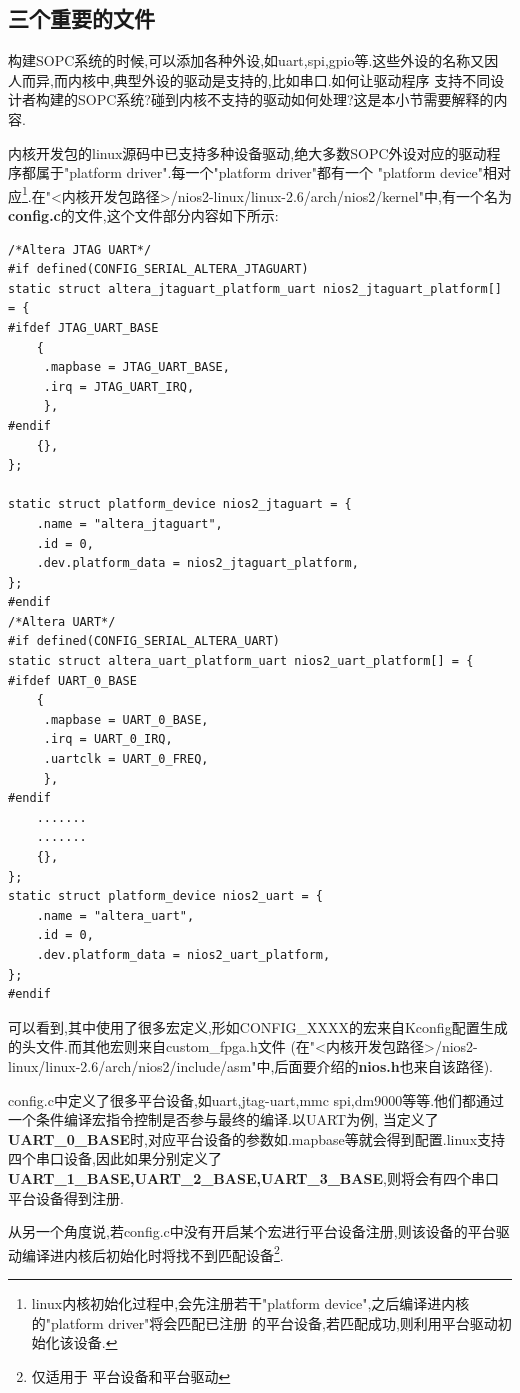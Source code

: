 \documentclass[12pt,a4paper,titlepage]{article}
\begin{document}
\subsection{三个重要的文件}
构建SOPC系统的时候,可以添加各种外设,如uart,spi,gpio等.这些外设的名称又因人而异,而内核中,典型外设的驱动是支持的,比如串口.如何让驱动程序
支持不同设计者构建的SOPC系统?碰到内核不支持的驱动如何处理?这是本小节需要解释的内容.

内核开发包的linux源码中已支持多种设备驱动,绝大多数SOPC外设对应的驱动程序都属于"platform driver".每一个"platform driver"都有一个
"platform device"相对应\footnote{linux内核初始化过程中,会先注册若干"platform device",之后编译进内核的"platform driver"将会匹配已注册
的平台设备,若匹配成功,则利用平台驱动初始化该设备.}.在"<内核开发包路径>/nios2-linux/linux-2.6/arch/nios2/kernel"中,有一个名为
\textbf{config.c}的文件,这个文件部分内容如下所示:
\begin{verbatim}
/*Altera JTAG UART*/
#if defined(CONFIG_SERIAL_ALTERA_JTAGUART)
static struct altera_jtaguart_platform_uart nios2_jtaguart_platform[] = {
#ifdef JTAG_UART_BASE
	{
	 .mapbase = JTAG_UART_BASE,
	 .irq = JTAG_UART_IRQ,
	 },
#endif
	{},
};

static struct platform_device nios2_jtaguart = {
	.name = "altera_jtaguart",
	.id = 0,
	.dev.platform_data = nios2_jtaguart_platform,
};
#endif
/*Altera UART*/
#if defined(CONFIG_SERIAL_ALTERA_UART)
static struct altera_uart_platform_uart nios2_uart_platform[] = {
#ifdef UART_0_BASE
	{
	 .mapbase = UART_0_BASE,
	 .irq = UART_0_IRQ,
	 .uartclk = UART_0_FREQ,
	 },
#endif
	.......
	.......
	{},
};
static struct platform_device nios2_uart = {
	.name = "altera_uart",
	.id = 0,
	.dev.platform_data = nios2_uart_platform,
};
#endif
\end{verbatim}
可以看到,其中使用了很多宏定义,形如CONFIG\_XXXX的宏来自Kconfig配置生成的头文件.而其他宏则来自custom\_fpga.h文件
(在"<内核开发包路径>/nios2-linux/linux-2.6/arch/nios2/include/asm"中,后面要介绍的\textbf{nios.h}也来自该路径).

config.c中定义了很多平台设备,如uart,jtag-uart,mmc spi,dm9000等等.他们都通过一个条件编译宏指令控制是否参与最终的编译.以UART为例,
当定义了\textbf{UART\_0\_BASE}时,对应平台设备的参数如.mapbase等就会得到配置.linux支持四个串口设备,因此如果分别定义了
\textbf{UART\_1\_BASE,UART\_2\_BASE,UART\_3\_BASE},则将会有四个串口平台设备得到注册.

从另一个角度说,若config.c中没有开启某个宏进行平台设备注册,则该设备的平台驱动编译进内核后初始化时将找不到匹配设备\footnote{仅适用于
平台设备和平台驱动}.
\end{document}
